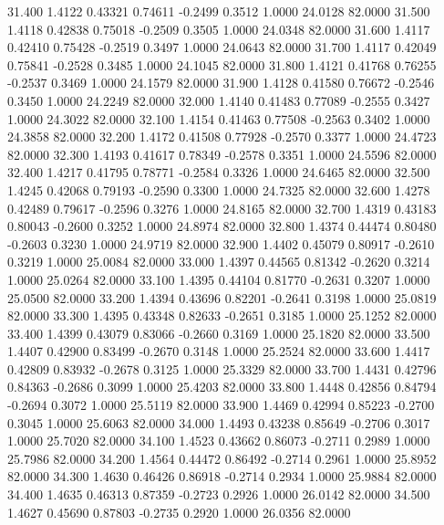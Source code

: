   31.400   1.4122   0.43321   0.74611  -0.2499   0.3512   1.0000  24.0128  82.0000
  31.500   1.4118   0.42838   0.75018  -0.2509   0.3505   1.0000  24.0348  82.0000
  31.600   1.4117   0.42410   0.75428  -0.2519   0.3497   1.0000  24.0643  82.0000
  31.700   1.4117   0.42049   0.75841  -0.2528   0.3485   1.0000  24.1045  82.0000
  31.800   1.4121   0.41768   0.76255  -0.2537   0.3469   1.0000  24.1579  82.0000
  31.900   1.4128   0.41580   0.76672  -0.2546   0.3450   1.0000  24.2249  82.0000
  32.000   1.4140   0.41483   0.77089  -0.2555   0.3427   1.0000  24.3022  82.0000
  32.100   1.4154   0.41463   0.77508  -0.2563   0.3402   1.0000  24.3858  82.0000
  32.200   1.4172   0.41508   0.77928  -0.2570   0.3377   1.0000  24.4723  82.0000
  32.300   1.4193   0.41617   0.78349  -0.2578   0.3351   1.0000  24.5596  82.0000
  32.400   1.4217   0.41795   0.78771  -0.2584   0.3326   1.0000  24.6465  82.0000
  32.500   1.4245   0.42068   0.79193  -0.2590   0.3300   1.0000  24.7325  82.0000
  32.600   1.4278   0.42489   0.79617  -0.2596   0.3276   1.0000  24.8165  82.0000
  32.700   1.4319   0.43183   0.80043  -0.2600   0.3252   1.0000  24.8974  82.0000
  32.800   1.4374   0.44474   0.80480  -0.2603   0.3230   1.0000  24.9719  82.0000
  32.900   1.4402   0.45079   0.80917  -0.2610   0.3219   1.0000  25.0084  82.0000
  33.000   1.4397   0.44565   0.81342  -0.2620   0.3214   1.0000  25.0264  82.0000
  33.100   1.4395   0.44104   0.81770  -0.2631   0.3207   1.0000  25.0500  82.0000
  33.200   1.4394   0.43696   0.82201  -0.2641   0.3198   1.0000  25.0819  82.0000
  33.300   1.4395   0.43348   0.82633  -0.2651   0.3185   1.0000  25.1252  82.0000
  33.400   1.4399   0.43079   0.83066  -0.2660   0.3169   1.0000  25.1820  82.0000
  33.500   1.4407   0.42900   0.83499  -0.2670   0.3148   1.0000  25.2524  82.0000
  33.600   1.4417   0.42809   0.83932  -0.2678   0.3125   1.0000  25.3329  82.0000
  33.700   1.4431   0.42796   0.84363  -0.2686   0.3099   1.0000  25.4203  82.0000
  33.800   1.4448   0.42856   0.84794  -0.2694   0.3072   1.0000  25.5119  82.0000
  33.900   1.4469   0.42994   0.85223  -0.2700   0.3045   1.0000  25.6063  82.0000
  34.000   1.4493   0.43238   0.85649  -0.2706   0.3017   1.0000  25.7020  82.0000
  34.100   1.4523   0.43662   0.86073  -0.2711   0.2989   1.0000  25.7986  82.0000
  34.200   1.4564   0.44472   0.86492  -0.2714   0.2961   1.0000  25.8952  82.0000
  34.300   1.4630   0.46426   0.86918  -0.2714   0.2934   1.0000  25.9884  82.0000
  34.400   1.4635   0.46313   0.87359  -0.2723   0.2926   1.0000  26.0142  82.0000
  34.500   1.4627   0.45690   0.87803  -0.2735   0.2920   1.0000  26.0356  82.0000
